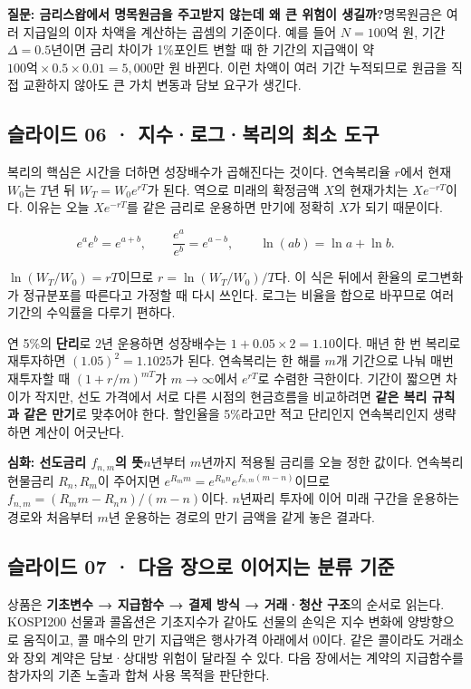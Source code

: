 \documentclass[11pt,a4paper]{article}
\begin{document}
\par\medskip\noindent\textbf{질문: 금리스왑에서 명목원금을 주고받지 않는데 왜 큰 위험이 생길까?}\quad 명목원금은 여러 지급일의 이자 차액을 계산하는 곱셈의 기준이다. 예를 들어 $N=100$억 원, 기간 $\Delta=0.5$년이면 금리 차이가 1\%포인트 변할 때 한 기간의 지급액이 약 $100\text{억}\times0.5\times0.01=5{,}000$만 원 바뀐다. 이런 차액이 여러 기간 누적되므로 원금을 직접 교환하지 않아도 큰 가치 변동과 담보 요구가 생긴다.\par

\subsection{슬라이드 06 · 지수·로그·복리의 최소 도구}
복리의 핵심은 시간을 더하면 성장배수가 곱해진다는 것이다. 연속복리율 $r$에서 현재 $W_0$는 $T$년 뒤 $W_T=W_0e^{rT}$가 된다. 역으로 미래의 확정금액 $X$의 현재가치는 $Xe^{-rT}$이다. 이유는 오늘 $Xe^{-rT}$를 같은 금리로 운용하면 만기에 정확히 $X$가 되기 때문이다.\par

\[
e^a e^b=e^{a+b},\qquad \frac{e^a}{e^b}=e^{a-b},\qquad \ln(ab)=\ln a+\ln b.
\]

$\ln(W_T/W_0)=rT$이므로 $r=\ln(W_T/W_0)/T$다. 이 식은 뒤에서 환율의 로그변화가 정규분포를 따른다고 가정할 때 다시 쓰인다. 로그는 비율을 합으로 바꾸므로 여러 기간의 수익률을 다루기 편하다.\par

연 5\%의 \textbf{단리}로 2년 운용하면 성장배수는 $1+0.05\times2=1.10$이다. 매년 한 번 복리로 재투자하면 $(1.05)^2=1.1025$가 된다. 연속복리는 한 해를 $m$개 기간으로 나눠 매번 재투자할 때 $(1+r/m)^{mT}$가 $m\to\infty$에서 $e^{rT}$로 수렴한 극한이다. 기간이 짧으면 차이가 작지만, 선도 가격에서 서로 다른 시점의 현금흐름을 비교하려면 \textbf{같은 복리 규칙과 같은 만기}로 맞추어야 한다. 할인율을 5\%라고만 적고 단리인지 연속복리인지 생략하면 계산이 어긋난다.\par

\par\medskip\noindent\textbf{심화: 선도금리 $f_{n,m}$의 뜻}\quad $n$년부터 $m$년까지 적용될 금리를 오늘 정한 값이다. 연속복리 현물금리 $R_n,R_m$이 주어지면 $e^{R_m m}=e^{R_n n}e^{f_{n,m}(m-n)}$이므로 $f_{n,m}=(R_m m-R_n n)/(m-n)$이다. $n$년짜리 투자에 이어 미래 구간을 운용하는 경로와 처음부터 $m$년 운용하는 경로의 만기 금액을 같게 놓은 결과다.\par

\subsection{슬라이드 07 · 다음 장으로 이어지는 분류 기준}
상품은 \textbf{기초변수 → 지급함수 → 결제 방식 → 거래·청산 구조}의 순서로 읽는다. KOSPI200 선물과 콜옵션은 기초지수가 같아도 선물의 손익은 지수 변화에 양방향으로 움직이고, 콜 매수의 만기 지급액은 행사가격 아래에서 0이다. 같은 콜이라도 거래소와 장외 계약은 담보·상대방 위험이 달라질 수 있다. 다음 장에서는 계약의 지급함수를 참가자의 기존 노출과 합쳐 사용 목적을 판단한다.\par
\end{document}
